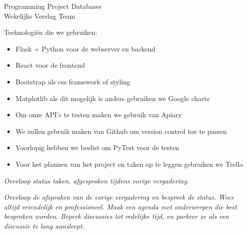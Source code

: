 \documentclass[a4paper]{article}
\newcounter{team}
\begin{document}
	
	\begin{Minutes}{Programming Project Databases \\ Wekelijks Verslag Team }
		\missingNoExcuse{\ldots}
		\missingExcused{\ldots}
		
		\maketitle
		
		
		Technologiën die we gebruiken:
		\begin{itemize}
		    \item Flask + Python voor de webserver en backend
		    \item React voor de frontend
		    \item Bootstrap als css framework of styling
		    \item Matplotlib als dit mogelijk is anders gebruiken we Google charts
		    \item Om onze API's te testen maken we gebruik van Apiary
		    \item We zullen gebruik maken van Github om version control toe te passen
		    \item Voorlopig hebben we beslist om PyTest voor de testen
		    \item Voor het plannen van het project en taken op te leggen gebruiken we Trello
		\end{itemize}
		
			\emph{Overloop status taken, afgesproken tijdens vorige vergadering.}
		
			

			
			\emph{Overloop de afspraken van de vorige vergadering en bespreek de status. Wees altijd vriendelijk en professioneel. Maak een agenda met onderwerpen die best besproken worden. Beperk discussies tot redelijke tijd, en parkeer ze als een discussie te lang aansleept.}
			

\end{Minutes}
\end{document}
